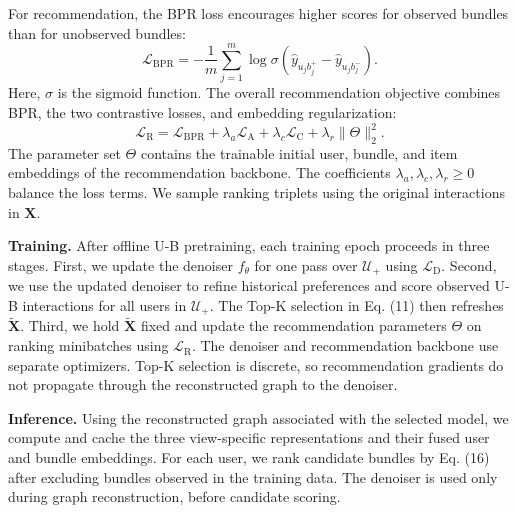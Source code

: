 \documentclass[letterpaper]{article}
\begin{document}
For recommendation, the BPR loss \cite{rendle2009bpr} encourages higher scores for observed bundles than for unobserved bundles:
\begin{equation}
\mathcal L_{\mathrm{BPR}}
=-\frac{1}{m}
\sum_{j=1}^{m}
\log\sigma\!\left(\hat y_{u_jb_j^+}-\hat y_{u_jb_j^-}\right).
\tag{18}
\end{equation}
Here, $\sigma$ is the sigmoid function. The overall recommendation objective combines BPR, the two contrastive losses, and embedding regularization:
\begin{equation}
\mathcal L_{\mathrm R}
=\mathcal L_{\mathrm{BPR}}
+\lambda_a\mathcal L_{\mathrm A}
+\lambda_c\mathcal L_{\mathrm C}
+\lambda_r\|\Theta\|_2^2.
\tag{19}
\end{equation}
The parameter set $\Theta$ contains the trainable initial user, bundle, and item embeddings of the recommendation backbone. The coefficients $\lambda_a,\lambda_c,\lambda_r\geq0$ balance the loss terms. We sample ranking triplets using the original interactions in $\mathbf X$.

\textbf{Training.} After offline U-B pretraining, each training epoch proceeds in three stages. First, we update the denoiser $f_\theta$ for one pass over $\mathcal U_+$ using $\mathcal L_{\mathrm D}$. Second, we use the updated denoiser to refine historical preferences and score observed U-B interactions for all users in $\mathcal U_+$. The Top-K selection in Eq. (11) then refreshes $\widetilde{\mathbf X}$. Third, we hold $\widetilde{\mathbf X}$ fixed and update the recommendation parameters $\Theta$ on ranking minibatches using $\mathcal L_{\mathrm R}$. The denoiser and recommendation backbone use separate optimizers. Top-K selection is discrete, so recommendation gradients do not propagate through the reconstructed graph to the denoiser.

\textbf{Inference.} Using the reconstructed graph associated with the selected model, we compute and cache the three view-specific representations and their fused user and bundle embeddings. For each user, we rank candidate bundles by Eq. (16) after excluding bundles observed in the training data. The denoiser is used only during graph reconstruction, before candidate scoring.
\end{document}
